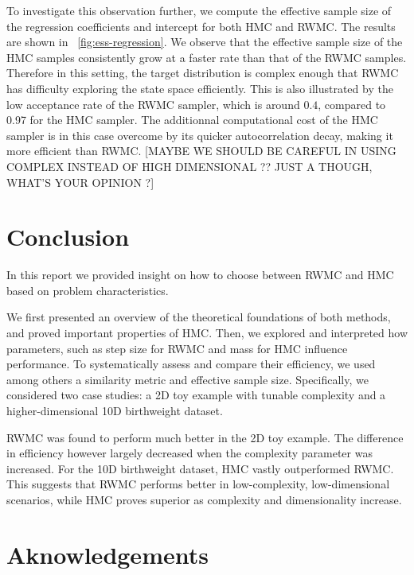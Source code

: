 \documentclass[a4paper, 12pt,oneside]{article}
\begin{document}
		To investigate this observation further, we compute the effective sample size of the regression coefficients and intercept for both HMC and RWMC. The results are shown in ~\ref{fig:ess-regression}. We observe that the effective sample size of the HMC samples consistently grow at a faster rate than that of the RWMC samples. Therefore in this setting, the target distribution is complex enough that RWMC has difficulty exploring the state space efficiently. This is also illustrated by the low acceptance rate of the RWMC sampler, which is around $0.4$, compared to 0.97 for the HMC sampler. The additionnal computational cost of the HMC sampler is in this case overcome by its quicker autocorrelation decay, making it more efficient than RWMC. [MAYBE WE SHOULD BE CAREFUL IN USING COMPLEX INSTEAD OF HIGH DIMENSIONAL ?? JUST A THOUGH, WHAT'S YOUR OPINION ?]
	\section{Conclusion}
	In this report we provided insight on how to choose between RWMC and HMC based on problem characteristics. 
	
	We first presented an overview of the theoretical foundations of both methods, and proved important properties of HMC.	
	Then, we explored and interpreted how parameters, such as step size for RWMC and mass for HMC influence performance. To systematically assess and compare their efficiency, we used among others a similarity metric and effective sample size. 
	Specifically, we considered two case studies: a 2D toy example with tunable complexity and a higher-dimensional 10D birthweight dataset. 
	
	RWMC was found to perform much better in the 2D toy example. The difference in efficiency however largely decreased when the complexity parameter was increased. For the 10D birthweight dataset, HMC vastly outperformed RWMC.  
	This suggests that RWMC performs better in low-complexity, low-dimensional scenarios, while HMC proves superior as complexity and dimensionality increase.
	\section*{Aknowledgements}
	\newpage
\end{document}
